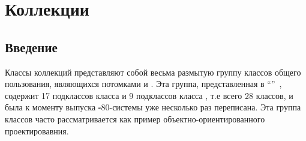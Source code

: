 \documentclass[a4paper,10pt,twoside]{book}
\begin{document}
	\sloppy
\fi
\chapter{Коллекции}


\section{Введение}

Классы коллекций представляют собой весьма размытую группу классов общего пользования, являющихся потомками  и . Эта группа, представленная в ``''~\cite{Gold83a}, содержит 17 подклассов класса  и 9 подклассов класса , т.е всего 28 классов, и была к моменту выпуска \st-80-системы уже несколько раз переписана. Эта группа классов часто рассматривается как  пример объектно-ориентированного проектировавния.
\end{document}
